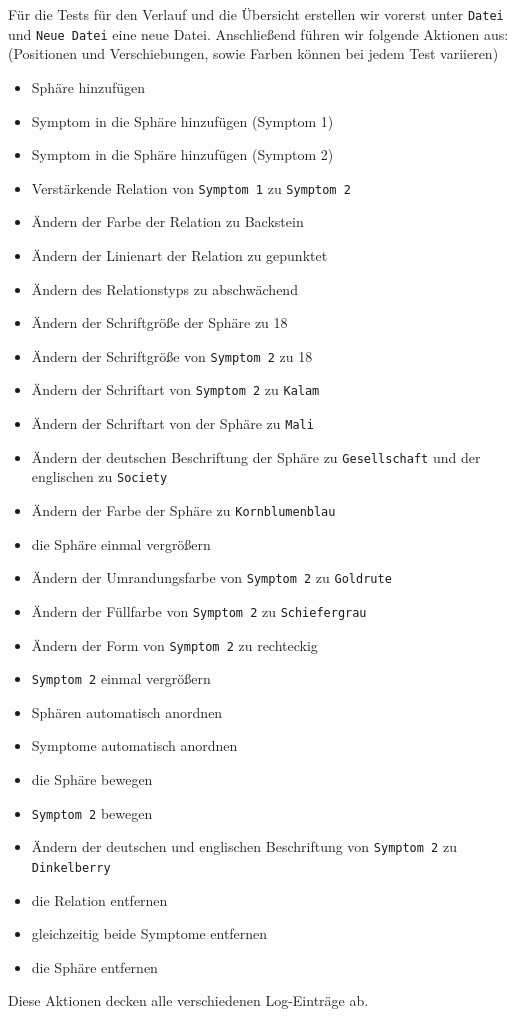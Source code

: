 \documentclass[enabledeprecatedfontcommands]{scrartcl}
\begin{document}
Für die Tests für den Verlauf und die Übersicht erstellen wir vorerst unter \texttt{Datei} und \texttt{Neue Datei} eine neue Datei. Anschließend führen wir folgende Aktionen aus: (Positionen und Verschiebungen, sowie Farben können bei jedem Test variieren)\\
\begin{itemize}  
\item Sphäre hinzufügen
\item Symptom in die Sphäre hinzufügen (Symptom 1) 
\item Symptom in die Sphäre hinzufügen (Symptom 2)
\item Verstärkende Relation von \texttt{Symptom 1} zu \texttt{Symptom 2}
\item Ändern der Farbe der Relation zu Backstein
\item Ändern der Linienart der Relation zu gepunktet 
\item Ändern des Relationstyps zu abschwächend 
\item Ändern der Schriftgröße der Sphäre zu 18
\item Ändern der Schriftgröße von \texttt{Symptom 2} zu 18
\item Ändern der Schriftart von \texttt{Symptom 2} zu \texttt{Kalam}
\item Ändern der Schriftart von der Sphäre zu \texttt{Mali}
\item Ändern der deutschen Beschriftung der Sphäre zu \texttt{Gesellschaft} und der englischen zu \texttt{Society}
\item Ändern der Farbe der Sphäre zu \texttt{Kornblumenblau}
\item die Sphäre einmal vergrößern 
\item Ändern der Umrandungsfarbe von \texttt{Symptom 2} zu \texttt{Goldrute} 
\item Ändern der Füllfarbe von \texttt{Symptom 2} zu \texttt{Schiefergrau} 
\item Ändern der Form von \texttt{Symptom 2} zu rechteckig
\item \texttt{Symptom 2} einmal vergrößern
\item Sphären automatisch anordnen
\item Symptome automatisch anordnen
\item die Sphäre bewegen 
\item \texttt{Symptom 2} bewegen
\item Ändern der deutschen und englischen Beschriftung von \texttt{Symptom 2} zu \texttt{Dinkelberry}
\item die Relation entfernen
\item gleichzeitig beide Symptome entfernen
\item die Sphäre entfernen
\end{itemize}
Diese Aktionen decken alle verschiedenen Log-Einträge ab. 
\end{document}
